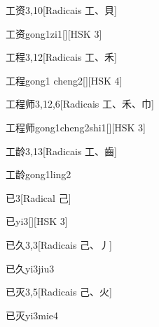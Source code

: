 \begin{entry}{工资}{3,10}[Radicais ⼯、⾙]
  \begin{phonetics}{工资}{gong1zi1}[][HSK 3]
  \end{phonetics}
\end{entry}

\begin{entry}{工程}{3,12}[Radicais ⼯、⽲]
  \begin{phonetics}{工程}{gong1 cheng2}[][HSK 4]
  \end{phonetics}
\end{entry}

\begin{entry}{工程师}{3,12,6}[Radicais ⼯、⽲、⼱]
  \begin{phonetics}{工程师}{gong1cheng2shi1}[][HSK 3]
  \end{phonetics}
\end{entry}

\begin{entry}{工龄}{3,13}[Radicais ⼯、⿒]
  \begin{phonetics}{工龄}{gong1ling2}
  \end{phonetics}
\end{entry}

\begin{entry}{已}{3}[Radical ⼰]
  \begin{phonetics}{已}{yi3}[][HSK 3]
  \end{phonetics}
\end{entry}

\begin{entry}{已久}{3,3}[Radicais ⼰、⼃]
  \begin{phonetics}{已久}{yi3jiu3}
  \end{phonetics}
\end{entry}

\begin{entry}{已灭}{3,5}[Radicais ⼰、⽕]
  \begin{phonetics}{已灭}{yi3mie4}
  \end{phonetics}
\end{entry}

